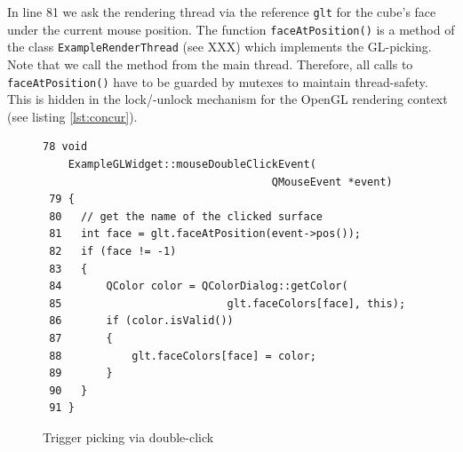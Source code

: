 \documentclass[jou,noapacite]{apa}
\begin{document}
In line 81 we ask the rendering thread via the reference \lstinline|glt| for the
cube's face under the current mouse position.
%
The function \lstinline|faceAtPosition()| is a method of the
class \lstinline|ExampleRenderThread| (see XXX) which implements the
GL-picking.
%
Note that we call the method from the main thread.
%
Therefore, all calls to \lstinline|faceAtPosition()| have to be guarded by
mutexes to maintain thread-safety.
%
This is hidden in the lock/-unlock mechanism for the OpenGL rendering context
(see listing \ref{lst:concur}).
\begin{figure}[h]
\begin{lstlisting}[basicstyle=\scriptsize]
 78 void
    ExampleGLWidget::mouseDoubleClickEvent(
                                    QMouseEvent *event)
 79 {
 80   // get the name of the clicked surface
 81   int face = glt.faceAtPosition(event->pos());
 82   if (face != -1)
 83   {
 84       QColor color = QColorDialog::getColor(
 85                          glt.faceColors[face], this);
 86       if (color.isValid())
 87       {
 88           glt.faceColors[face] = color;
 89       }
 90   }
 91 }
\end{lstlisting}
\caption{Trigger picking via double-click}
\label{lst:dclick}
\end{figure}
\end{document}
